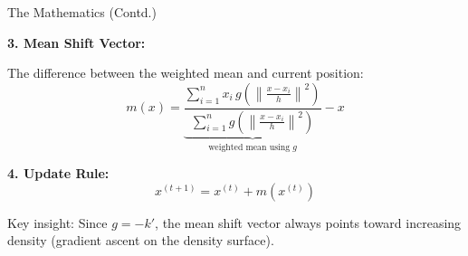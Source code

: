 \begin{frame}{The Mathematics (Contd.)}

    \textbf{3. Mean Shift Vector:}

    The difference between the weighted mean and current position:
    \[
    m(x) = \underbrace{\frac{\sum_{i=1}^{n} x_i \, g\left(\left\|\frac{x - x_i}{h}\right\|^2\right)}{\sum_{i=1}^{n} g\left(\left\|\frac{x - x_i}{h}\right\|^2\right)}}_{\text{weighted mean using } g} - x
    \]

    \vspace{0.3cm}

    \textbf{4. Update Rule:}
    \[
    x^{(t+1)} = x^{(t)} + m(x^{(t)})
    \]

    \small{\textcolor{customred}{Key insight:} Since $g = -k'$, the mean shift vector always points toward increasing density (gradient ascent on the density surface).}
\end{frame}

